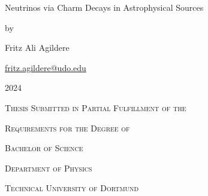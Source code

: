 \begin{titlepage}
		\centering
		\null
		\vspace{7\baselineskip}
		{\Huge{Neutrinos via Charm Decays in Astrophysical Sources}\par}
		\vspace{2\baselineskip}
		by\par
		{\Large{{Fritz Ali Agildere}\par}}\href{mailto:fritz.agildere@udo.edu}{fritz.agildere@udo.edu}\par2024\par
		\vspace{6\baselineskip}
		{\textsc{Thesis Submitted in Partial Fulfillment of the}\par}
		{\textsc{Requirements for the Degree of}\par}
		{\textsc{Bachelor of Science}\par}
		\vspace{5\baselineskip}
		{\textsc{Department of Physics}\par}
		{\textsc{Technical University of Dortmund}\par}
		\vfill
		\null
\end{titlepage}
